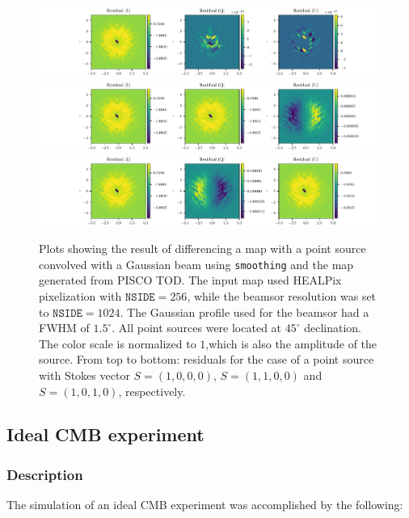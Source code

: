 \documentclass[a4paper,11pt]{article}
\begin{document}
\begin{figure}
	\centering
	\includegraphics[width=1.0\linewidth]{figures/figure5_3rd_I.pdf}
	\includegraphics[width=1.0\linewidth]{figures/figure5_3rd_Q.pdf}
	\includegraphics[width=1.0\linewidth]{figures/figure5_3rd_U.pdf}
	\caption{Plots showing the result of differencing a map with a point source convolved with a Gaussian beam using \texttt{smoothing} and the map generated from PISCO TOD. The input map used HEALPix pixelization with $\mathrm{\texttt{NSIDE}} = 256$, while the beamsor resolution was set to $\mathrm{\texttt{NSIDE}} = 1024$. The Gaussian profile used for the beamsor had a FWHM of $1.5^\circ$. All point sources were located at $45^\circ$ declination. The color scale is normalized to $1$,which is also the amplitude of the source. From top to bottom: residuals for the case of a point source with Stokes vector $S = (1,0,0,0)$, $S=(1,1,0,0)$ and $S=(1,0,1,0)$, respectively.}
	\label{fig::stokesqsource256beam1024dec45}
\end{figure}

\subsection{Ideal CMB experiment}
\label{subsec::ideal_full_sky}

\subsubsection{Description}

The simulation of an ideal CMB experiment was accomplished by the following:
\end{document}
